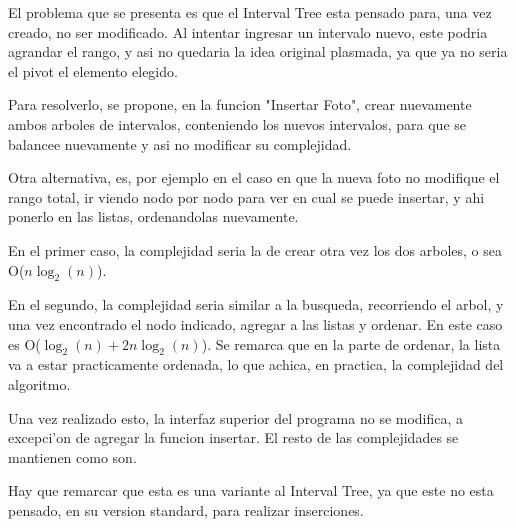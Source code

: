 El problema que se presenta es que el Interval Tree esta pensado para, una vez creado, no ser modificado. Al intentar ingresar un intervalo nuevo, este podria agrandar el rango, y asi no quedaria la idea original plasmada, ya que ya no seria el pivot el elemento elegido.


Para resolverlo, se propone, en la funcion "Insertar Foto", crear nuevamente ambos arboles de intervalos, conteniendo los nuevos intervalos, para que se balancee nuevamente y asi no modificar su complejidad.


Otra alternativa, es, por ejemplo en el caso en que la nueva foto no modifique el rango total, ir viendo nodo por nodo para ver en cual se puede insertar, y ahi ponerlo en las listas, ordenandolas nuevamente.


En el primer caso, la complejidad seria la de crear otra vez los dos arboles, o sea O($n\log_2(n)$).


En el segundo, la complejidad seria similar a la busqueda, recorriendo el arbol, y una vez encontrado el nodo indicado, agregar a las listas y ordenar. En este caso es O($\log_2(n) + 2n\log_2(n)$). Se remarca que en la parte de ordenar, la lista va a estar practicamente ordenada, lo que achica, en practica, la complejidad del algoritmo.

Una vez realizado esto, la interfaz superior del programa no se modifica, a excepci'on de agregar la funcion insertar. El resto de las complejidades se mantienen como son.

Hay que remarcar que esta es una variante al Interval Tree, ya que este no esta pensado, en su version standard, para realizar inserciones.

